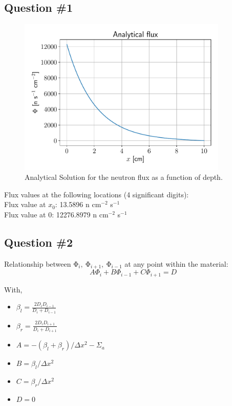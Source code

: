 \documentclass[11pt,a4paper]{article}
\begin{document}
\subsection{Question \#1}
\begin{figure}[h]
\includegraphics[width=10cm]{fig/Ex1_Analytical.pdf}
\centering
\caption{Analytical Solution for the neutron flux as a function of depth.}
\end{figure}
Flux values at the following locations (4 significant digits):\\
Flux value at $x_0$: 13.5896 n cm$^{-2}$ s$^{-1}$ \\
Flux value at $0$: 12276.8979 n cm$^{-2}$ s$^{-1}$ \\

\subsection{Question \#2}

Relationship between $\mathrm{\Phi}_i,\ \mathrm{\Phi}_{i+1},\ \mathrm{\Phi}_{i-1}$ at any point within the material:
\begin{equation}
    A \Phi_i + B \Phi_{i-1} +C \Phi_{i+1} = D
\end{equation}

With,
\begin{itemize}
	\item $\beta_l = \frac{2D_i D_{i-1}}{D_i + D_{i-1}}$
	\item $\beta_r = \frac{2D_i D_{i+1}}{D_i + D_{i+1}}$
	\item $A = -(\beta_l + \beta_r)/\Delta x^2 - \Sigma_a$
	\item $B = \beta_l/\Delta x^2$
	\item $C = \beta_r/\Delta x^2$
	\item $D = 0$
\end{itemize}
\end{document}
